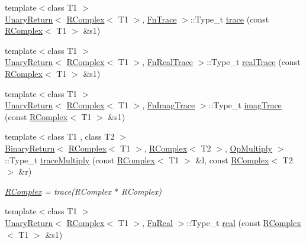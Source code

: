 \begin{DoxyCompactItemize}
\item 
{\footnotesize template$<$class T1 $>$ }\\\mbox{\hyperlink{structENSEM_1_1UnaryReturn}{Unary\+Return}}$<$ \mbox{\hyperlink{classENSEM_1_1RComplex}{R\+Complex}}$<$ T1 $>$, \mbox{\hyperlink{structENSEM_1_1FnTrace}{Fn\+Trace}} $>$\+::Type\+\_\+t \mbox{\hyperlink{group__rcomplex_ga9f6f9e69dbfccacb954b9fd9947ca592}{trace}} (const \mbox{\hyperlink{classENSEM_1_1RComplex}{R\+Complex}}$<$ T1 $>$ \&s1)
\item 
{\footnotesize template$<$class T1 $>$ }\\\mbox{\hyperlink{structENSEM_1_1UnaryReturn}{Unary\+Return}}$<$ \mbox{\hyperlink{classENSEM_1_1RComplex}{R\+Complex}}$<$ T1 $>$, \mbox{\hyperlink{structENSEM_1_1FnRealTrace}{Fn\+Real\+Trace}} $>$\+::Type\+\_\+t \mbox{\hyperlink{group__rcomplex_ga27bda5008ac5b345ddf3273c5949d00c}{real\+Trace}} (const \mbox{\hyperlink{classENSEM_1_1RComplex}{R\+Complex}}$<$ T1 $>$ \&s1)
\item 
{\footnotesize template$<$class T1 $>$ }\\\mbox{\hyperlink{structENSEM_1_1UnaryReturn}{Unary\+Return}}$<$ \mbox{\hyperlink{classENSEM_1_1RComplex}{R\+Complex}}$<$ T1 $>$, \mbox{\hyperlink{structENSEM_1_1FnImagTrace}{Fn\+Imag\+Trace}} $>$\+::Type\+\_\+t \mbox{\hyperlink{group__rcomplex_ga57832278e9583a5d6e01e547dfdbb896}{imag\+Trace}} (const \mbox{\hyperlink{classENSEM_1_1RComplex}{R\+Complex}}$<$ T1 $>$ \&s1)
\item 
{\footnotesize template$<$class T1 , class T2 $>$ }\\\mbox{\hyperlink{structENSEM_1_1BinaryReturn}{Binary\+Return}}$<$ \mbox{\hyperlink{classENSEM_1_1RComplex}{R\+Complex}}$<$ T1 $>$, \mbox{\hyperlink{classENSEM_1_1RComplex}{R\+Complex}}$<$ T2 $>$, \mbox{\hyperlink{structENSEM_1_1OpMultiply}{Op\+Multiply}} $>$\+::Type\+\_\+t \mbox{\hyperlink{group__rcomplex_gaf1ed70437ca66203b33532ddb96e2657}{trace\+Multiply}} (const \mbox{\hyperlink{classENSEM_1_1RComplex}{R\+Complex}}$<$ T1 $>$ \&l, const \mbox{\hyperlink{classENSEM_1_1RComplex}{R\+Complex}}$<$ T2 $>$ \&r)
\begin{DoxyCompactList}\small\item\em \mbox{\hyperlink{classENSEM_1_1RComplex}{R\+Complex}} = trace(\+R\+Complex $\ast$ R\+Complex) \end{DoxyCompactList}\item 
{\footnotesize template$<$class T1 $>$ }\\\mbox{\hyperlink{structENSEM_1_1UnaryReturn}{Unary\+Return}}$<$ \mbox{\hyperlink{classENSEM_1_1RComplex}{R\+Complex}}$<$ T1 $>$, \mbox{\hyperlink{structENSEM_1_1FnReal}{Fn\+Real}} $>$\+::Type\+\_\+t \mbox{\hyperlink{group__rcomplex_gac6f6a1d512bae897437df14ec96570a7}{real}} (const \mbox{\hyperlink{classENSEM_1_1RComplex}{R\+Complex}}$<$ T1 $>$ \&s1)

\end{DoxyCompactItemize}
